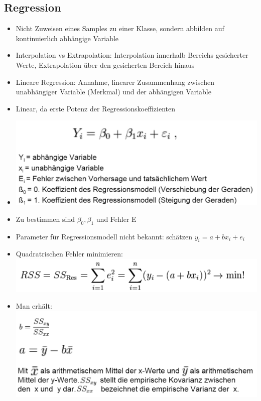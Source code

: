 \documentclass[a4paper,10pt,oneside]{article}
\begin{document}
\subsection{Regression}
\begin{itemize}
	\item Nicht Zuweisen eines Samples zu einer Klasse, sondern abbilden auf kontinuierlich abhängige Variable
	\item Interpolation vs Extrapolation: Interpolation innerhalb Bereichs gesicherter Werte, Extrapolation über den gesicherten Bereich hinaus
	\item Lineare Regression: Annahme, linearer Zusammenhang zwischen unabhängiger Variable (Merkmal) und der abhängigen Variable
	\item Linear, da erste Potenz der Regressionskoeffizienten
	\item \includegraphics[scale=0.65]{Grafiken/linregression.png}
	\item Zu bestimmen sind $\beta_0, \beta_1$ und Fehler E
	\item Parameter für Regressionsmodell nicht bekannt: schätzen $y_i=a+bx_i+e_i$
	\item Quadratrischen Fehler minimieren:
	\includegraphics[scale=0.65]{Grafiken/quadratfehler.png}
	\item Man erhält:
	\includegraphics[scale=0.65]{Grafiken/lsglinreg.png}

\end{itemize}
\end{document}
